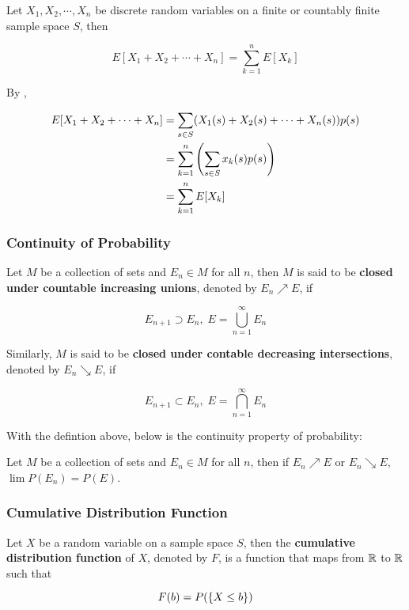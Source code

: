 \documentclass[a4paper,12pt]{article}
\begin{document}
\begin{pst}
  Let $X_{1},X_{2},\cdots,X_{n}$ be discrete random variables on a finite or countably finite sample space $S$, then

  $$E[X_{1}+X_{2}+\cdots+X_{n}]=\sum_{k=1}^{n}E[X_{k}]$$\s

  \prf By \rpst[\sctr{1}],

  $$\begin{aligned}[t]
    E[X_{1}+X_{2}+\cdots+X_{n}]&=\sum_{s\in S}(X_{1}(s)+X_{2}(s)+\cdots+X_{n}(s))p(s)\\
    &=\sum_{k=1}^{n}\left( \sum_{s\in S}x_{k}(s)p(s)\right)\\
    &=\sum_{k=1}^{n}E[X_{k}]
  \end{aligned}$$
\end{pst}\n

\subsubsection{Continuity of Probability}
\begin{dft}
  Let $M$ be a collection of sets and $E_{n}\in M$ for all $n$, then $M$ is said to be \textbf{closed under countable increasing unions}, denoted by $E_{n}\nearrow E$, if

  $$E_{n+1}\supset E_{n},\;E=\bigcup_{n=1}^{\infty}E_{n}$$\s

  Similarly, $M$ is said to be \textbf{closed under contable decreasing intersections}, denoted by $E_{n}\searrow E$, if

  $$E_{n+1}\subset E_{n},\;E=\bigcap_{n=1}^{\infty}E_{n}$$
\end{dft}\n

With the defintion above, below is the continuity property of probability:\n

\begin{pst}
  Let $M$ be a collection of sets and $E_{n}\in M$ for all $n$, then if $E_{n}\nearrow E$ or $E_{n}\searrow E$, $\lim P(E_{n})=P(E)$.
\end{pst}

\subsubsection{Cumulative Distribution Function}
\begin{dft}
  Let $X$ be a random variable on a sample space $S$, then the \textbf{cumulative distribution function} of $X$, denoted by $F$, is a function that maps from $\mathbb{R}$ to $\mathbb{R}$ such that

  $$F(b)=P(\left\{ X\leq b\right\})$$
\end{dft}\n
\end{document}
